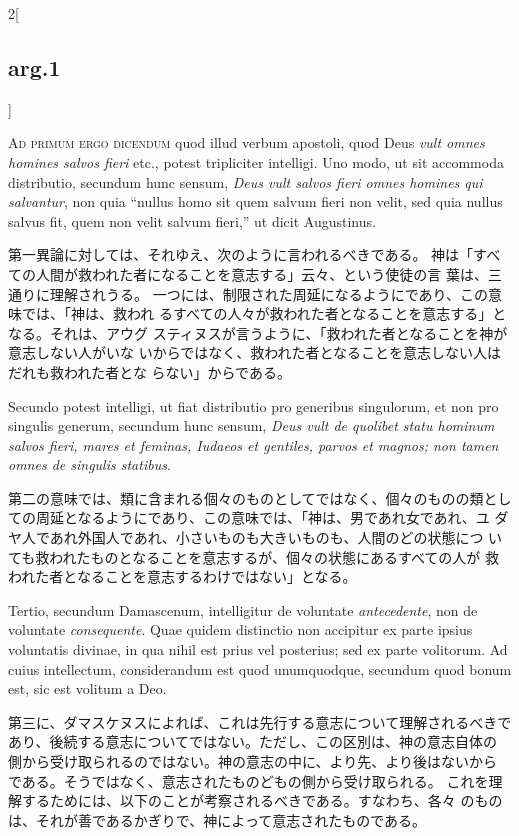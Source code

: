 \documentclass[paper=a4paper,fontsize=10pt,jafontsize=9pt,titlepage]{jlreq}
\begin{document}
\begin{paracol}{2}[\subsection{arg.1}]
\switchcolumn*[\subsection{ad.1}]


{\scshape Ad primum ergo dicendum} quod illud verbum
apostoli, quod Deus {\itshape vult omnes homines salvos fieri} etc., potest
tripliciter intelligi. Uno modo, ut sit accommoda distributio, secundum
hunc sensum, {\itshape Deus vult salvos fieri omnes homines qui salvantur}, non
quia ``nullus homo sit quem salvum fieri non velit, sed quia nullus salvus
fit, quem non velit salvum fieri,'' ut dicit Augustinus.

\switchcolumn

第一異論に対しては、それゆえ、次のように言われるべきである。
神は「すべての人間が救われた者になることを意志する」云々、という使徒の言
 葉は、三通りに理解されうる。
一つには、制限された周延になるようにであり、この意味では、「神は、救われ
 るすべての人々が救われた者となることを意志する」となる。それは、アウグ
 スティヌスが言うように、「救われた者となることを神が意志しない人がいな
 いからではなく、救われた者となることを意志しない人はだれも救われた者とな
 らない」からである。

\switchcolumn*


Secundo potest
intelligi, ut fiat distributio pro generibus singulorum, et non pro
singulis generum, secundum hunc sensum, {\itshape Deus vult de quolibet statu
hominum salvos fieri, mares et feminas, Iudaeos et gentiles, parvos et
magnos; non tamen omnes de singulis statibus}.

\switchcolumn

第二の意味では、類に含まれる個々のものとしてではなく、個々のものの類とし
 ての周延となるようにであり、この意味では、「神は、男であれ女であれ、ユ
 ダヤ人であれ外国人であれ、小さいものも大きいものも、人間のどの状態につ
 いても救われたものとなることを意志するが、個々の状態にあるすべての人が
 救われた者となることを意志するわけではない」となる。

\switchcolumn*


Tertio, secundum
Damascenum, intelligitur de voluntate {\itshape antecedente}, non de voluntate
{\itshape consequente}. 
Quae quidem distinctio non accipitur ex parte ipsius
voluntatis divinae, in qua nihil est prius vel posterius; sed ex parte
volitorum. Ad cuius intellectum, considerandum est quod unumquodque,
secundum quod bonum est, sic est volitum a Deo.

\switchcolumn

第三に、ダマスケヌスによれば、これは先行する意志について理解されるべきで
 あり、後続する意志についてではない。ただし、この区別は、神の意志自体の
 側から受け取られるのではない。神の意志の中に、より先、より後はないから
 である。そうではなく、意志されたものどもの側から受け取られる。
これを理解するためには、以下のことが考察されるべきである。すなわち、各々
 のものは、それが善であるかぎりで、神によって意志されたものである。


\end{paracol}
\end{document}
